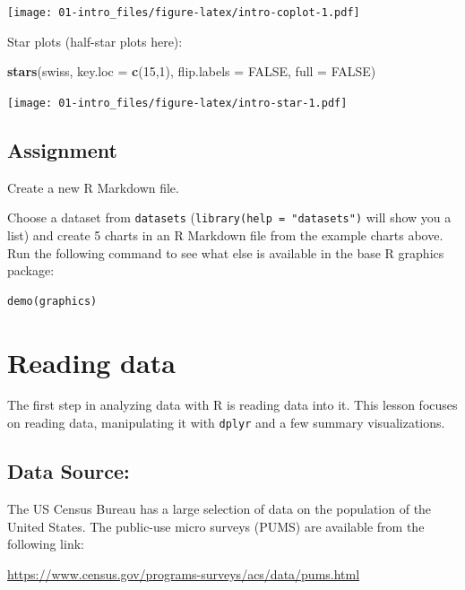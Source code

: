 \documentclass[]{book}
\newenvironment{Shaded}{\begin{snugshade}}{\end{snugshade}}
\newcommand{\KeywordTok}[1]{\textcolor[rgb]{0.13,0.29,0.53}{\textbf{{#1}}}}
\newcommand{\DataTypeTok}[1]{\textcolor[rgb]{0.13,0.29,0.53}{{#1}}}
\newcommand{\DecValTok}[1]{\textcolor[rgb]{0.00,0.00,0.81}{{#1}}}
\newcommand{\OtherTok}[1]{\textcolor[rgb]{0.56,0.35,0.01}{{#1}}}
\newcommand{\NormalTok}[1]{{#1}}
\theoremstyle{definition}
\theoremstyle{definition}
\theoremstyle{remark}
\begin{document}
\texttt{[image: 01-intro\_files/figure-latex/intro-coplot-1.pdf]}

Star plots (half-star plots here):

\begin{Shaded}
\begin{Highlighting}[]
\KeywordTok{stars}\NormalTok{(swiss, }\DataTypeTok{key.loc =} \KeywordTok{c}\NormalTok{(}\DecValTok{15}\NormalTok{,}\DecValTok{1}\NormalTok{), }\DataTypeTok{flip.labels =} \OtherTok{FALSE}\NormalTok{, }\DataTypeTok{full =} \OtherTok{FALSE}\NormalTok{)}
\end{Highlighting}
\end{Shaded}

\texttt{[image: 01-intro\_files/figure-latex/intro-star-1.pdf]}

\section{Assignment}\label{assignment}

Create a new R Markdown file.

Choose a dataset from \texttt{datasets}
(\texttt{library(help\ =\ "datasets")} will show you a list) and create
5 charts in an R Markdown file from the example charts above. Run the
following command to see what else is available in the base R graphics
package:

\begin{verbatim}
demo(graphics)
\end{verbatim}

\hypertarget{read-data}{\chapter{Reading data}\label{read-data}}

The first step in analyzing data with R is reading data into it. This
lesson focuses on reading data, manipulating it with \texttt{dplyr} and
a few summary visualizations.

\section{Data Source:}\label{data-source}

The US Census Bureau has a large selection of data on the population of
the United States. The public-use micro surveys (PUMS) are available
from the following link:

\url{https://www.census.gov/programs-surveys/acs/data/pums.html}
\end{document}
